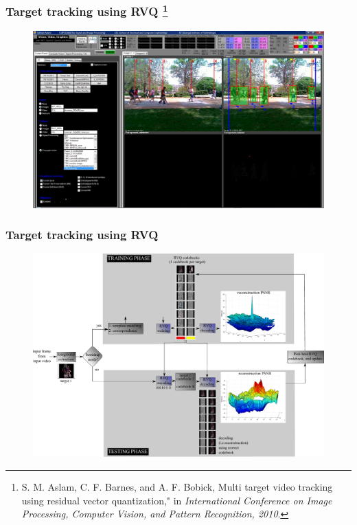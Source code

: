 \begin{frame}
\frametitle{Target tracking using RVQ		\tiny{\footnote{S. M. Aslam, C. F. Barnes, and A. F. Bobick, Multi target video tracking using residual vector quantization," in \emph{International Conference on Image Processing, Computer Vision, and Pattern Recognition, 2010}.}}}
\logoCSIPCPL\mypagenum
	\begin{figure}		
		\centering		
		\includegraphics[width=1.0\textwidth]{figs/Proposal_fig3_RVQ_MTT_snapshot_VVG}
		\label{fig:snapshot_VVG}
	\end{figure}	
\end{frame}


\begin{frame}[plain]
\frametitle{Target tracking using RVQ}
	\begin{changemargin}{-1.3in}{0in}
	\begin{figure}		
		\includegraphics[width=1.3\textwidth]{figs/RVQ_TRK_IPCV2010_BlockDiagram_detailed.pdf}
	\end{figure}	
	\end{changemargin}
\end{frame}



